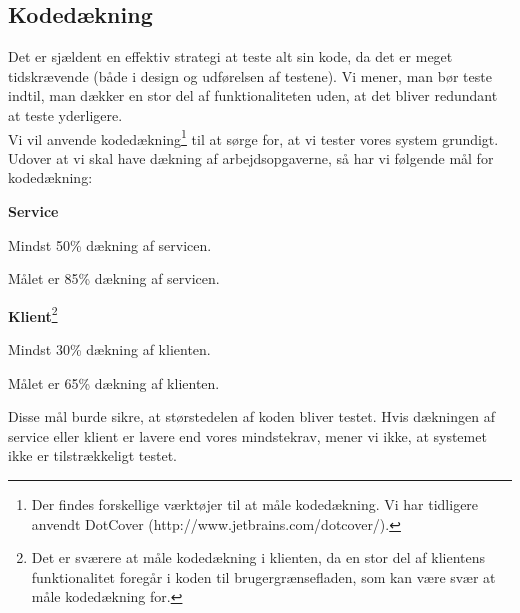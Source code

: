 \subsection*{Kodedækning}
\label{Test_intendedStrat_coverage}
Det er sjældent en effektiv strategi at teste alt sin kode, da det er meget tidskrævende (både i design og udførelsen af testene). Vi mener, man bør teste indtil, man dækker en stor del af funktionaliteten uden, at det bliver redundant at teste yderligere. 
\\Vi vil anvende kodedækning\footnote{Der findes forskellige værktøjer til at måle kodedækning. Vi har tidligere anvendt DotCover (http://www.jetbrains.com/dotcover/).} til at sørge for, at vi tester vores system grundigt. Udover at vi skal have dækning af arbejdsopgaverne, så har vi følgende mål for kodedækning:
\begin{my_itemize}
\item \textbf{Service}
\item Mindst 50\% dækning af servicen.
\item Målet er 85\% dækning af servicen.
\item \textbf{Klient}\footnote{Det er sværere at måle kodedækning i klienten, da en stor del af klientens funktionalitet foregår i koden til brugergrænsefladen, som kan være svær at måle kodedækning for.}
\item Mindst 30\% dækning af klienten.
\item Målet er 65\% dækning af klienten. 
\end{my_itemize}

Disse mål burde sikre, at størstedelen af koden bliver testet. Hvis dækningen af service eller klient er lavere end vores mindstekrav, mener vi ikke, at systemet ikke er tilstrækkeligt testet.